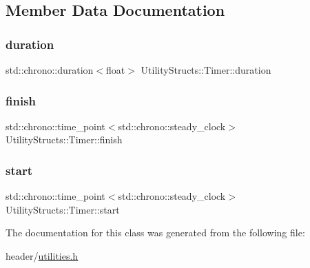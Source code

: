 \subsection{Member Data Documentation}
\mbox{\label{class_utility_structs_1_1_timer_aa78ff6477de7008371025bd459a262e4}} 
\subsubsection{\texorpdfstring{duration}{duration}}
{\footnotesize\ttfamily std\+::chrono\+::duration$<$float$>$ Utility\+Structs\+::\+Timer\+::duration}

\mbox{\label{class_utility_structs_1_1_timer_a9b87226726489b3885d6faf4373c34b5}} 
\subsubsection{\texorpdfstring{finish}{finish}}
{\footnotesize\ttfamily std\+::chrono\+::time\+\_\+point$<$std\+::chrono\+::steady\+\_\+clock$>$ Utility\+Structs\+::\+Timer\+::finish}

\mbox{\label{class_utility_structs_1_1_timer_a60bc754cb86990dad0003e8d49048c07}} 
\subsubsection{\texorpdfstring{start}{start}}
{\footnotesize\ttfamily std\+::chrono\+::time\+\_\+point$<$std\+::chrono\+::steady\+\_\+clock$>$ Utility\+Structs\+::\+Timer\+::start}



The documentation for this class was generated from the following file\+:\begin{DoxyCompactItemize}
\item 
header/\hyperlink{utilities_8h}{utilities.\+h}\end{DoxyCompactItemize}
